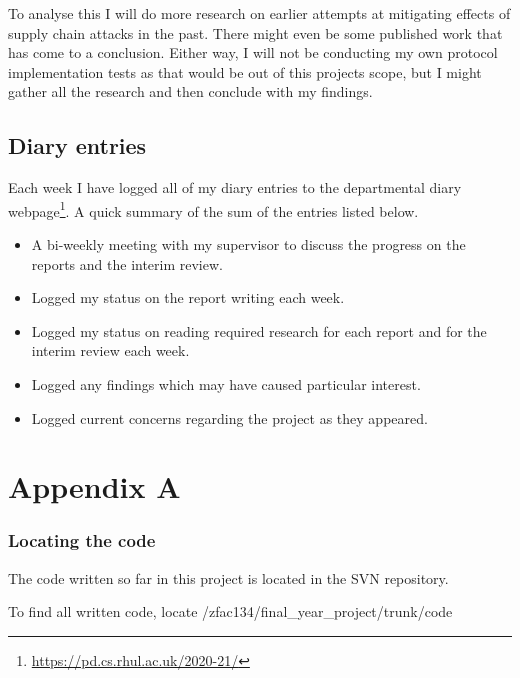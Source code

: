 \documentclass[]{final_report}
\begin{document}
\par{To analyse this I will do more research on earlier attempts at mitigating effects of supply chain attacks in the past. There might even be some published work that has come to a conclusion. Either way, I will not be conducting my own protocol implementation tests as that would be out of this projects scope, but I might gather all the research and then conclude with my findings.}

\section*{Diary entries}

\par{Each week I have logged all of my diary entries to the departmental diary webpage\footnote{\url{https://pd.cs.rhul.ac.uk/2020-21/}}. A quick summary of the sum of the entries listed below.}

\begin{itemize}
\item{A bi-weekly meeting with my supervisor to discuss the progress on the reports and the interim review.}
\item{Logged my status on the report writing each week.}
\item{Logged my status on reading required research for each report and for the interim review each week.}
\item{Logged any findings which may have caused particular interest.}
\item{Logged current concerns regarding the project as they appeared.}
\end{itemize}


\newpage
{}




\label{endpage}

\chapter*{Appendix A}
\label{appendixa}

\subsection*{Locating the code}
\par{The code written so far in this project is located in the SVN repository.}
\par{To find all written code, locate /zfac134/final\_year\_project/trunk/code}
\end{document}
